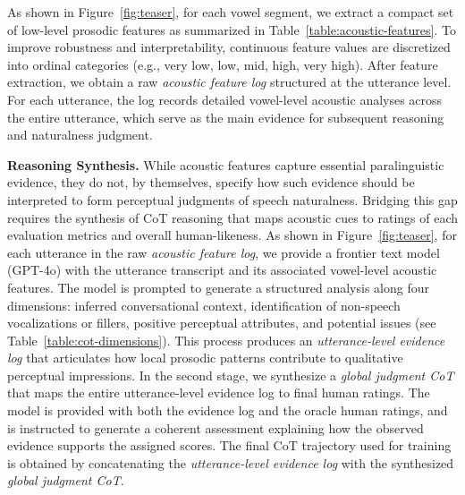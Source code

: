 As shown in Figure~\ref{fig:teaser}, for each vowel segment, we extract a compact set of low-level prosodic features as summarized in Table~\ref{table:acoustic-features}. To improve robustness and interpretability, continuous feature values are discretized into ordinal categories (e.g., very low, low, mid, high, very high). After feature extraction, we obtain a raw \emph{acoustic feature log} structured at the utterance level. For each utterance, the log records detailed vowel-level acoustic analyses across the entire utterance, which serve as the main evidence for subsequent reasoning and naturalness judgment.

\textbf{Reasoning Synthesis.} While acoustic features capture essential paralinguistic evidence, they do not, by themselves, specify how such evidence should be interpreted to form perceptual judgments of speech naturalness. Bridging this gap requires the synthesis of CoT reasoning that maps acoustic cues to ratings of each evaluation metrics and overall human-likeness. As shown in Figure~\ref{fig:teaser}, for each utterance in the raw \emph{acoustic feature log}, we provide a frontier text model (GPT-4o) with the utterance transcript and its associated vowel-level acoustic features. The model is prompted to generate a structured analysis along four dimensions: inferred conversational context, identification of non-speech vocalizations or fillers, positive perceptual attributes, and potential issues (see Table~\ref{table:cot-dimensions}). This process produces an \emph{utterance-level evidence log} that articulates how local prosodic patterns contribute to qualitative perceptual impressions. In the second stage, we synthesize a \emph{global judgment CoT} that maps the entire utterance-level evidence log to final human ratings. The model is provided with both the evidence log and the oracle human ratings, and is instructed to generate a coherent assessment explaining how the observed evidence supports the assigned scores. The final CoT trajectory used for training is obtained by concatenating the \emph{utterance-level evidence log} with the synthesized \emph{global judgment CoT}. 

